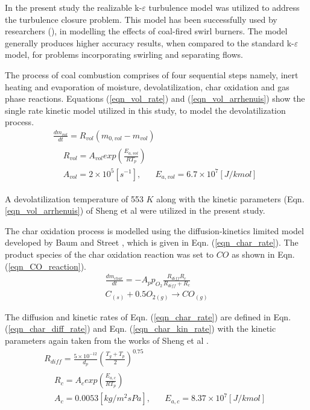 \documentclass[twocolumn,10pt]{asme2ej}
\begin{document}
In the present study the realizable k-$\varepsilon$ turbulence model was utilized to address the turbulence closure problem. This model has been successfully used by researchers (\cite{Belosevic2019a, Laubscher2019a, Modlinski2019}), in modelling the effects of coal-fired swirl burners. The model generally produces higher accuracy results, when compared to the standard k-$\varepsilon$ model, for problems incorporating swirling and separating flows.

The process of coal combustion comprises of four sequential steps namely, inert heating and evaporation of moisture, devolatilization, char oxidation and gas phase reactions. Equations (\ref{eqn_vol_rate}) and (\ref{eqn_vol_arrhenuis}) show the single rate kinetic model utilized in this study, to model the devolatilization process.
\begin{gather}
\frac{dm_{vol}}{dt} = R_{vol}(m_{0,vol}-m_{vol}) \label{eqn_vol_rate} \\
\begin{split}
&R_{vol} = A_{vol}exp\left(\frac{E_{a,vol}}{RT_p}\right)\\
&A_{vol} = 2\times10^5 [s^{-1}],\,\,\,\,\,\,\,\,\,\,E_{a,vol} = 6.7\times10^7 [J/kmol] \label{eqn_vol_arrhenuis}
\end{split}
\end{gather}

A devolatilization temperature of 553 $K$ \cite{Ranade2015} along with the kinetic parameters (Eqn. \ref{eqn_vol_arrhenuis}) of Sheng et al \cite{Sheng2004} were utilized in the present study.

The char oxidation process is modelled using the diffusion-kinetics limited model developed by Baum and Street \cite{Baum1971}, which is given in Eqn. (\ref{eqn_char_rate}). The product species of the char oxidation reaction was set to $CO$ as shown in Eqn. (\ref{eqn_CO_reaction}). 
\begin{gather}
\frac{dm_{char}}{dt} = -A_p p_{O_{2}} \frac{R_{diff}R_c}{R_{diff} + R_c}  \label{eqn_char_rate}\\
C_{(s)}+0.5O_{2(g)}\to CO_{(g)} \label{eqn_CO_reaction}
\end{gather}

The diffusion and kinetic rates of Eqn. (\ref{eqn_char_rate}) are defined in Eqn. (\ref{eqn_char_diff_rate})  and Eqn. (\ref{eqn_char_kin_rate}) with the kinetic parameters again taken from the works of Sheng et al \cite{Sheng2004}.
\begin{gather}
R_{diff} = \frac{5\times10^{-12}}{d_p} \left(\frac{T_g+T_p}{2}\right)^{0.75} \label{eqn_char_diff_rate}\\
\begin{split}
&R_{c} = A_{c}exp\left(\frac{E_{a,c}}{RT_p}\right)\\
&A_{c} = 0.0053 [kg/m^2sPa],\,\,\,\,\,\,\,\,\,\,E_{a,c} = 8.37\times10^7 [J/kmol]
\end{split}
 \label{eqn_char_kin_rate}
\end{gather}
\end{document}
